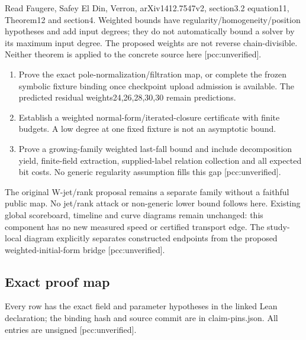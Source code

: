 \documentclass[
  10pt,
]{article}
\providecommand{\tightlist}{%
  \setlength{\itemsep}{0pt}\setlength{\parskip}{0pt}}
\begin{document}
Read Faugere, Safey El Din, Verron, arXiv1412.7547v2, section3.2
equation11, Theorem12 and section4. Weighted bounds have
regularity/homogeneity/position hypotheses and add input degrees; they
do not automatically bound a solver by its maximum input degree. The
proposed weights are not reverse chain-divisible. Neither theorem is
applied to the concrete source here {[}pcc:unverified{]}.

\begin{enumerate}
\def\labelenumi{\arabic{enumi}.}
\tightlist
\item
  Prove the exact pole-normalization/filtration map, or complete the
  frozen symbolic fixture binding once checkpoint upload admission is
  available. The predicted residual weights24,26,28,30,30 remain
  predictions.
\item
  Establish a weighted normal-form/iterated-closure certificate with
  finite budgets. A low degree at one fixed fixture is not an asymptotic
  bound.
\item
  Prove a growing-family weighted last-fall bound and include
  decomposition yield, finite-field extraction, supplied-label relation
  collection and all expected bit costs. No generic regularity
  assumption fills this gap {[}pcc:unverified{]}.
\end{enumerate}

The original W-jet/rank proposal remains a separate family without a
faithful public map. No jet/rank attack or non-generic lower bound
follows here. Existing global scoreboard, timeline and curve diagrams
remain unchanged: this component has no new measured speed or certified
transport edge. The study-local diagram explicitly separates constructed
endpoints from the proposed weighted-initial-form bridge
{[}pcc:unverified{]}.

\subsection{Exact proof map}\label{exact-proof-map}

Every row has the exact field and parameter hypotheses in the linked
Lean declaration; the binding hash and source commit are in
claim-pins.json. All entries are unsigned {[}pcc:unverified{]}.
\end{document}
